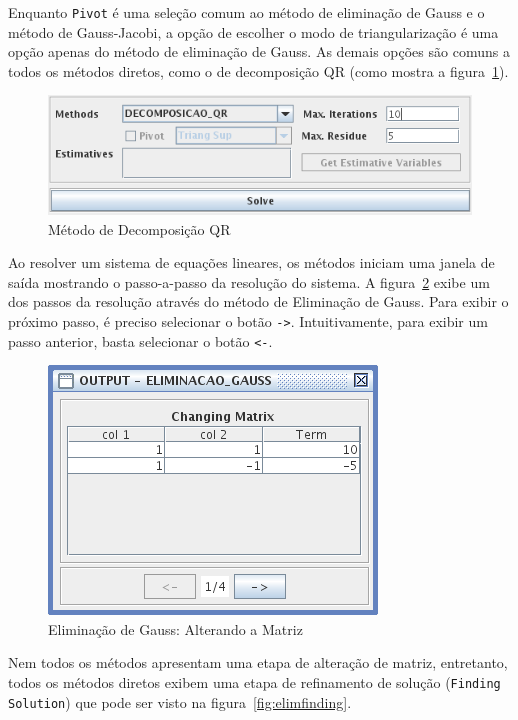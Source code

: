 \documentclass[a4paper,10pt]{report}
\begin{document}
Enquanto \verb|Pivot| é uma seleção comum ao método de eliminação de Gauss e o método de Gauss-Jacobi, a opção de escolher o modo de triangularização é uma opção apenas do método de eliminação de Gauss. As demais opções são comuns a todos os métodos diretos, como o de decomposição QR (como mostra a figura~\ref{fig:qr}).

\begin{figure}[ht]
 \centering
 \includegraphics[scale=0.8, bb=0 0 353 100]{screen-7-decomp.png}
 \caption{Método de Decomposição QR}
 \label{fig:qr}
\end{figure}

Ao resolver um sistema de equações lineares, os métodos iniciam uma janela de saída mostrando o passo-a-passo da resolução do sistema. A figura~\ref{fig:elimchang} exibe um dos passos da resolução através do método de Eliminação de Gauss. Para exibir o próximo passo, é preciso selecionar o botão \verb|->|. Intuitivamente, para exibir um passo anterior, basta selecionar o botão \verb|<-|.

\begin{figure}[ht]
 \centering
 \includegraphics[scale=0.8, bb=0 0 222 168]{screen-8-elim-changing.png}
 \caption{Eliminação de Gauss: Alterando a Matriz}
 \label{fig:elimchang}
\end{figure}

Nem todos os métodos apresentam uma etapa de alteração de matriz, entretanto, todos os métodos diretos exibem uma etapa de refinamento de solução (\verb|Finding Solution|) que pode ser visto na figura~\ref{fig:elimfinding}.
\end{document}

